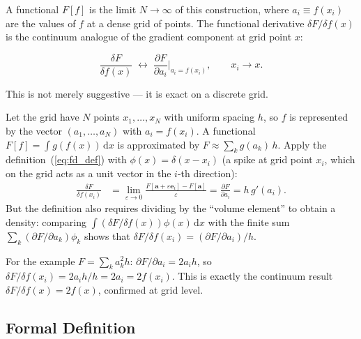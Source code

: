 \documentclass[12pt,letterpaper]{article}
\newcommand{\dd}{\mathrm{d}}
\theoremstyle{definition}
\begin{document}
A functional $F[f]$ is the limit $N\to\infty$ of this construction,
where $a_i \equiv f(x_i)$ are the values of $f$ at a dense grid of
points. The functional derivative $\delta F/\delta f(x)$ is the
continuum analogue of the gradient component at grid point $x$:

\begin{equation}
  \frac{\delta F}{\delta f(x)} \;\longleftrightarrow\;
  \frac{\partial F}{\partial a_i}\bigg|_{a_i = f(x_i)},
  \qquad x_i \to x.
  \label{eq:fd_gradient_analogy}
\end{equation}

This is not merely suggestive --- it is exact on a discrete grid.
\begin{derivbox}[title={Proof: functional derivative = partial derivative / grid spacing}]
Let the grid have $N$ points $x_1,\ldots,x_N$ with uniform spacing $h$,
so $f$ is represented by the vector $(a_1,\ldots,a_N)$ with $a_i = f(x_i)$.
A functional $F[f] = \int g(f(x))\,\dd x$ is approximated by
$F \approx \sum_k g(a_k)\,h$.
Apply the definition~(\ref{eq:fd_def}) with $\phi(x) = \delta(x-x_i)$
(a spike at grid point $x_i$, which on the grid acts as a unit vector in
the $i$-th direction):
\begin{align}
  \frac{\delta F}{\delta f(x_i)}
  &= \lim_{\varepsilon\to 0}
     \frac{F[\bm{a}+\varepsilon\bm{e}_i] - F[\bm{a}]}{\varepsilon}
   = \frac{\partial F}{\partial a_i}
   = h\,g'(a_i).
\end{align}
But the definition also requires dividing by the ``volume element'' to
obtain a density: comparing $\int(\delta F/\delta f(x))\phi(x)\,\dd x$
with the finite sum $\sum_k (\partial F/\partial a_k)\phi_k$ shows
that $\delta F/\delta f(x_i) = (\partial F/\partial a_i)/h$.

For the example $F=\sum_k a_k^2 h$:
$\partial F/\partial a_i = 2a_i h$, so
$\delta F/\delta f(x_i) = 2a_i h / h = 2a_i = 2f(x_i)$.
This is exactly the continuum result $\delta F/\delta f(x)=2f(x)$,
confirmed at grid level.
\end{derivbox}

\subsection{Formal Definition}
\end{document}
